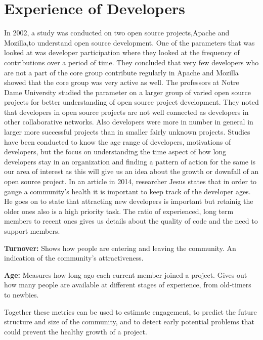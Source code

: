 \documentclass[seploa]{beavtex}
\begin{document}
\section{Experience of Developers}
In 2002, a study was conducted on two open source projects,Apache and Mozilla,to understand open source development. One of the parameters that was looked at was developer participation where they looked at the frequency of contributions over a period of time. They concluded that very few developers who are not a part of the core group contribute regularly in Apache and Mozilla showed that the core group was very active as well\cite{mockus2002}. The professors at Notre Dame University studied the parameter on a larger group of varied open source projects for better understanding of open source project development. They noted that developers in open source projects are not well connected as developers in other collaborative networks. Also developers were more in number in general in larger more successful projects than in smaller fairly unknown projects\cite{greg2002}. Studies have been conducted to know the age range of developers, motivations of developers, but the focus on understanding the time aspect of how long developers stay in an organization and finding a pattern of action for the same is our area of interest as this will give us an idea about the growth or downfall of an open source project. In an article in 2014, researcher Jesus states that in order to gauge a community's health it is important to keep track of the developer ages. He goes on to state that attracting new developers is important but retainig the older ones also is a high priority task. The ratio of experienced, long term members to recent ones gives us details about the quality of code and the need to support members\cite{jes2014}.

\textbf{Turnover:}
Shows how people are entering and leaving the community. An indication of the community's attractiveness.

\textbf{Age:}
Measures how long ago each current member joined a project. Gives out how many people are available at different stages of experience, from old-timers to newbies.

Together these metrics can be used to estimate engagement, to predict the future structure and size of the community, and to detect early potential problems that could prevent the healthy growth of a project\cite{jes2014}.
\end{document}
